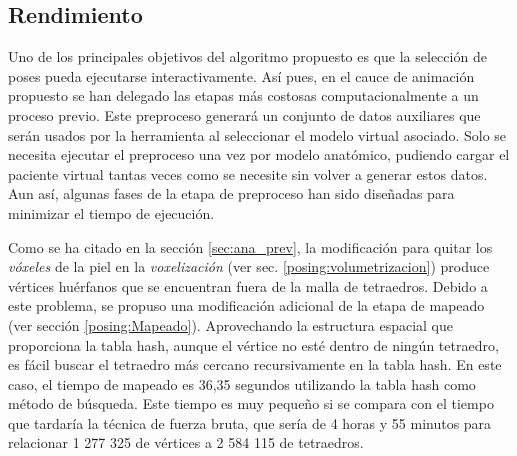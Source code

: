 \clearpage


\subsection{Rendimiento}
\label{sec:rendimiento}

Uno de los principales objetivos del algoritmo propuesto es que la selección de poses pueda ejecutarse interactivamente. Así pues, en el cauce de animación propuesto se han delegado las etapas más costosas computacionalmente a un proceso previo. Este preproceso generará un conjunto de datos auxiliares que serán usados por la herramienta al seleccionar el modelo virtual asociado. Solo se necesita ejecutar el preproceso una vez por modelo anatómico, %
pudiendo cargar el paciente virtual tantas veces como se necesite sin volver a generar estos datos. Aun así, algunas fases de la etapa de preproceso han sido diseñadas para minimizar el tiempo de ejecución.


Como se ha citado en la sección \ref{sec:ana_prev}, la modificación para quitar los \emph{vóxeles} de la piel en la \emph{voxelización} (ver sec. \ref{posing:volumetrizacion}) produce vértices huérfanos que se encuentran fuera de la malla de tetraedros.
Debido a este problema, se propuso una modificación adicional de la etapa de mapeado (ver sección \ref{posing:Mapeado}). Aprovechando la estructura espacial que proporciona la \ac{tabla hash}, aunque el vértice no esté dentro de ningún tetraedro, es fácil buscar el tetraedro más cercano recursivamente en la \ac{tabla hash}. 
En este caso, el tiempo de mapeado es 36,35 segundos utilizando la \ac{tabla hash} como método de búsqueda. Este tiempo es muy pequeño si se compara con el tiempo que tardaría  la técnica de fuerza bruta, que sería de 4 horas y 55 minutos para relacionar 1 277 325 de vértices a 2 584 115 de tetraedros. %

